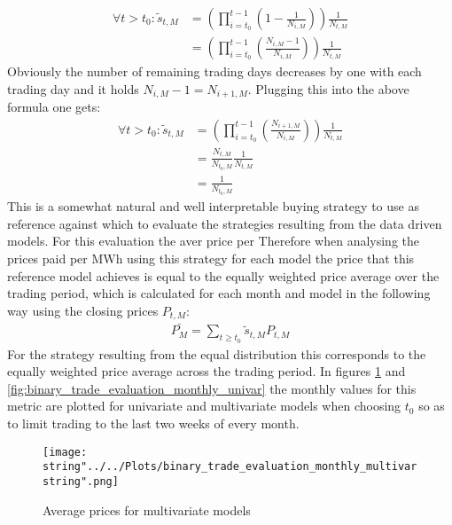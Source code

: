 \begin{align*}
\forall t > t_0: \tilde{s}_{t,M} &= (\prod_{i = t_{0}}^{t-1}(1-\frac{1}{N_{i,M}}))\frac{1}{N_{t,M}}\\
&= (\prod_{i = t_{0}}^{t-1}(\frac{N_{i,M} - 1}{N_{i,M}}))\frac{1}{N_{t,M}}
\end{align*}
Obviously the number of remaining trading days decreases by one with each trading day and it holds $N_{i,M} - 1 = N_{i+1,M}$. Plugging this into the above formula one gets:
\begin{align*}
\forall t > t_0: \tilde{s}_{t,M}  &= (\prod_{i = t_{0}}^{t-1}(\frac{N_{i+1,M}}{N_{i,M}}))\frac{1}{N_{t,M}} \\
&= \frac{N_{t,M}}{N_{t_0,M}}\frac{1}{N_{t,M}}\\
&= \frac{1}{N_{t_0,M}}
\end{align*}
This is a somewhat natural and well interpretable buying strategy to  use as reference against which to evaluate the strategies resulting from the data driven models. For this evaluation the aver price per 
Therefore when analysing the prices paid per MWh using this strategy for each model the price that this reference model achieves is equal to the equally weighted price average over the trading period, which is calculated for each month and model in the following way using the closing prices $P_{t,M}$:
\begin{align*}
\bar{P_M} = \sum_{t \geq t_0}\tilde{s}_{t,M}P_{t,M}
\end{align*}
For the strategy resulting from the equal distribution this corresponds to the equally weighted price average across the trading period. In figures \ref{fig:binary_trade_evaluation_monthly_multivar} and \ref{fig:binary_trade_evaluation_monthly_univar} the monthly values for this metric are plotted for univariate and multivariate models when choosing $t_0$ so as to limit trading to the last two weeks of every month.

\begin{figure}[h!]
  \centering
\texttt{[image: \\string"../../Plots/binary\_trade\_evaluation\_monthly\_multivar\\string".png]}
  \caption{Average prices for multivariate models}\label{fig:binary_trade_evaluation_monthly_multivar}
\end{figure}

